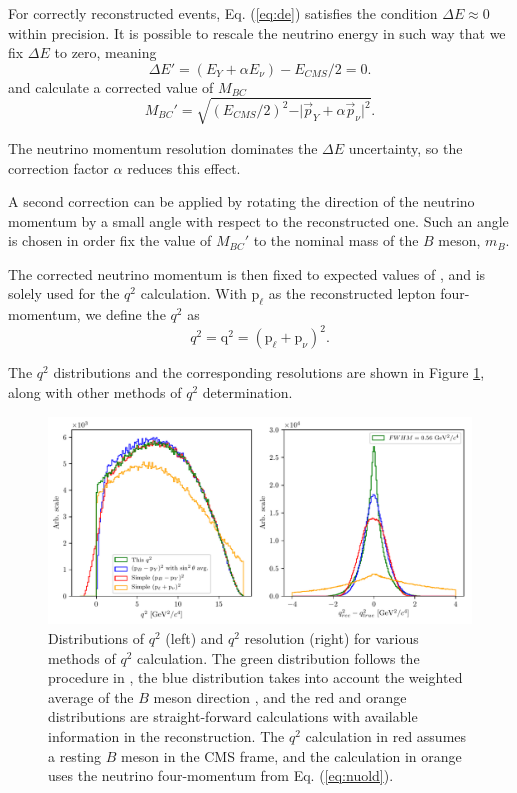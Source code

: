 For correctly reconstructed events, Eq. (\ref{eq:de}) satisfies the condition $\Delta E \approx 0$ within precision. It is possible to rescale the neutrino energy in such way that we fix $\Delta E$ to zero, meaning 
\begin{equation}
\Delta E' = (E_Y + \alpha E_\nu) - E_{CMS}/2 = 0.
\end{equation}
and calculate a corrected value of $M_{BC}$
\begin{equation}
M_{BC}' = \sqrt{\left(E_{CMS}/2\right)^2 - \vert \vec{p}_Y + \alpha \vec{p}_\nu \vert^2}.
\end{equation}

The neutrino momentum resolution dominates the $\Delta E$ uncertainty, so the correction factor $\alpha$ reduces this effect.

A second correction can be applied by rotating the direction of the neutrino momentum by a small angle with respect to the reconstructed one. Such an angle is chosen in order fix the value of $M_{BC}'$ to the nominal mass of the $B$ meson, $m_B$.

The corrected neutrino momentum is then fixed to expected values of \vars, and is solely used for the $q^2$ calculation. With $\mathrm{p}_\ell$ as the reconstructed lepton four-momentum, we define the $q^2$ as
\begin{equation}
\label{eq:q2}
q^2 = \mathrm{q}^2 = \left(\mathrm{p}_\ell + \mathrm{p}_\nu \right)^2.
\end{equation}

The $q^2$ distributions and the corresponding resolutions are shown in Figure \ref{fig:q2}, along with other methods of $q^2$ determination.
\begin{figure}[H]
	\centering
	\captionsetup{width=0.8\linewidth}
	\includegraphics[width=\linewidth]{fig/q2}
	\caption{Distributions of $q^2$ (left) and $q^2$ resolution (right) for various methods of $q^2$ calculation. The green distribution follows the procedure in \cite{VubCLEO}, the blue distribution takes into account the weighted average of the $B$ meson direction \cite{Ha:2010rf}, and the red and orange distributions are straight-forward calculations with available information in the reconstruction. The $q^2$ calculation in red assumes a resting $B$ meson in the CMS frame, and the calculation in orange uses the neutrino four-momentum from Eq. (\ref{eq:nuold}).}
	\label{fig:q2}
\end{figure}

